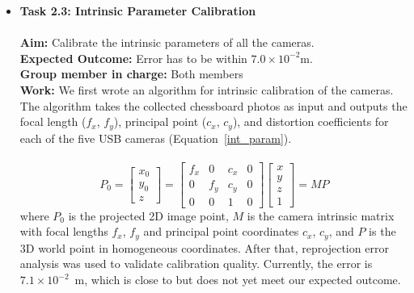 \documentclass[11pt]{article}
\begin{document}
\begin{itemize}
            
            \item \textbf{Task 2.3: Intrinsic Parameter Calibration}\\\\
            \textbf{Aim:} Calibrate the intrinsic parameters of all the cameras.\\
            \textbf{Expected Outcome:} Error has to be within $7.0\times10^{-2}$m.\\
            \textbf{Group member in charge:} Both members\\
            \textbf{Work:} We first wrote an algorithm for intrinsic calibration of the cameras. The algorithm takes the collected chessboard photos as input and outputs the focal length ($f_x$, $f_y$), principal point ($c_x$, $c_y$), and distortion coefficients for each of the five USB cameras (Equation~\ref{int_param}). \\\\
            \begin{equation}
            P_0
            = \begin{bmatrix}x_0 \\ y_0 \\ z\end{bmatrix}
            =
            \begin{bmatrix}
            f_x & 0 & c_x & 0 \\
            0 & f_y & c_y & 0 \\
            0 & 0 & 1 & 0
            \end{bmatrix}
            \begin{bmatrix}x \\ y \\ z \\ 1\end{bmatrix}
            = MP
            \label{int_param}
            \end{equation}
            where $P_0$ is the projected 2D image point, $M$ is the camera intrinsic matrix with focal lengths $f_x$, $f_y$ and principal point coordinates $c_x$, $c_y$, and $P$ is the 3D world point in homogeneous coordinates.
            After that, reprojection error analysis was used to validate calibration quality. Currently, the error is $7.1\times10^{-2}$~m, which is close to but does not yet meet our expected outcome.\\\\


\end{itemize}
\end{document}
